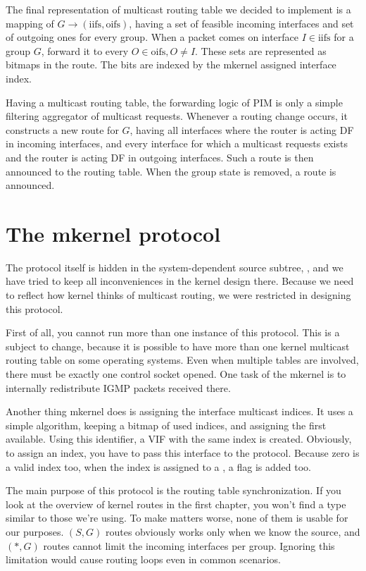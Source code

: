 The final representation of multicast routing table we decided to implement is
a mapping of $G \rightarrow (\mathrm{iifs}, \mathrm{oifs})$, having a set of feasible incoming
interfaces and set of outgoing ones for every group. When a packet comes on
interface $I \in \mathrm{iifs}$ for a group $G$, forward it to every $O \in \mathrm{oifs}, O \neq I$.
These sets are represented as bitmaps in the route. The bits are indexed by the
mkernel assigned interface index.

Having a multicast routing table, the forwarding logic of PIM is only a simple
filtering aggregator of multicast requests. Whenever a routing change occurs,
it constructs a new route for $G$, having all interfaces where the router is
acting DF in incoming interfaces, and every interface for which a multicast
requests exists and the router is acting DF in outgoing interfaces. Such
a route is then announced to the routing table. When the group state is
removed, a \NULL{} route is announced.

\section{The mkernel protocol}
The protocol itself is hidden in the system-dependent source subtree,
, and we have tried to keep all inconveniences in the
kernel design there. Because we need to reflect how kernel thinks of multicast
routing, we were restricted in designing this protocol.

First of all, you cannot run more than one instance of this protocol. This is
a subject to change, because it is possible to have more than one kernel
multicast routing table on some operating systems. Even when multiple tables
are involved, there must be exactly one control socket opened. One task of the
mkernel is to internally redistribute IGMP packets received there.

Another thing mkernel does is assigning the interface multicast indices. It
uses a simple algorithm, keeping a bitmap of used indices, and assigning the
first available. Using this identifier, a VIF with the same index is created.
Obviously, to assign an index, you have to pass this interface to the protocol.
Because zero is a valid index too, when the index is assigned to a , a flag  is added too.

The main purpose of this protocol is the routing table synchronization. If you
look at the overview of kernel routes in the first chapter, you won't find
a type similar to those we're using. To make matters worse, none of them is
usable for our purposes. $(S, G)$ routes obviously works only when we know the
source, and $(*,G)$ routes cannot limit the incoming interfaces per group.
Ignoring this limitation would cause routing loops even in common scenarios.


